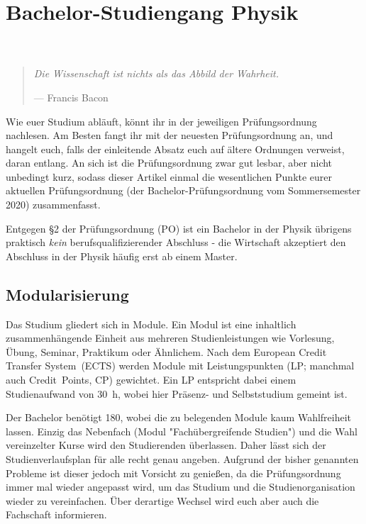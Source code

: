 \section[Bachelor-Studiengang Physik]{Bachelor-Studiengang Physik\\
\\}
\begin{multicols}{2}
\begin{quote}
	\textit{Die Wissenschaft ist nichts als das Abbild der Wahrheit.}
	
	\hfill--- Francis Bacon
\end{quote}

Wie euer Studium abläuft, könnt ihr in der jeweiligen Prüfungsordnung nachlesen. Am Besten fangt ihr mit der neuesten Prüfungsordnung an, und hangelt euch, falls der einleitende Absatz euch auf ältere Ordnungen verweist, daran entlang. An sich ist die Prüfungsordnung zwar gut lesbar, aber nicht unbedingt kurz, sodass dieser Artikel einmal die wesentlichen Punkte eurer aktuellen Prüfungsordnung (der Bachelor-Prüfungsordnung vom Sommersemester 2020) zusammenfasst.

Entgegen §2 der Prüfungsordnung (PO) ist ein Bachelor in der Physik übrigens praktisch \emph{kein} berufsqualifizierender Abschluss - die Wirtschaft akzeptiert den Abschluss in der Physik häufig erst ab einem Master.

\subsection{Modularisierung}
Das Studium gliedert sich in Module.
Ein Modul ist eine inhaltlich zusammenhängende Einheit aus mehreren Studienleistungen wie Vorlesung, Übung, Seminar, Praktikum oder Ähnlichem.
Nach dem European Credit Transfer System~(ECTS) werden Module mit Leistungspunkten (LP; manchmal auch Credit~Points, CP) gewichtet.
Ein LP entspricht dabei einem Studienaufwand von \SI{30}{\hour}, wobei hier Präsenz- und Selbststudium gemeint ist.

Der Bachelor benötigt \SI{180}{\LP}, wobei die zu belegenden Module kaum Wahlfreiheit lassen.
Einzig das Nebenfach (Modul "Fachübergreifende Studien") und die Wahl vereinzelter Kurse wird den Studierenden überlassen.
Daher lässt sich der Studienverlaufsplan für alle recht genau angeben.
Aufgrund der bisher genannten Probleme ist dieser jedoch mit Vorsicht zu genießen, da die Prüfungsordnung immer mal wieder angepasst wird, um das Studium und die Studienorganisation wieder zu vereinfachen.
Über derartige Wechsel wird euch aber auch die Fachschaft informieren.


\end{multicols}
